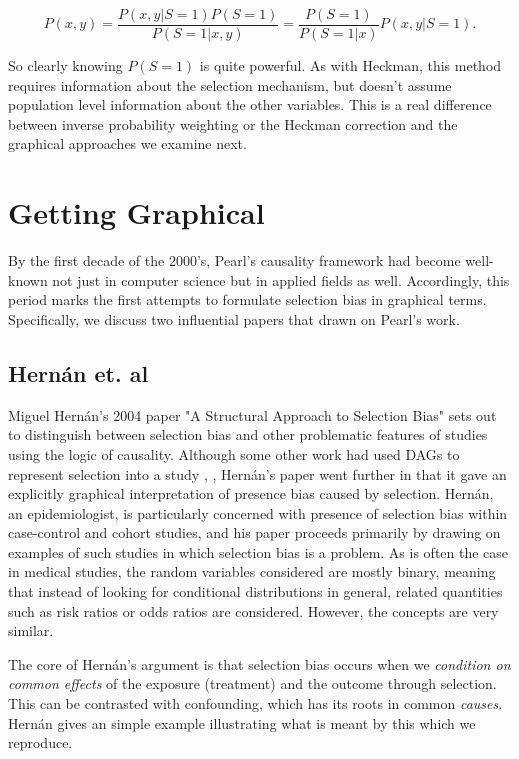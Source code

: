 \documentclass[12pt,twoside]{reedthesis}
\theoremstyle{definition}
\begin{document}
$$P(x,y) = \frac{P(x,y | S = 1) P(S = 1)}{P(S = 1 | x,y)} = \frac{P(S = 1)}{P(S = 1 | x )}P(x,y | S = 1).$$

So clearly knowing $P(S = 1)$ is quite powerful. As with Heckman, this method requires information about the selection mechanism, but doesn't assume population level information about the other variables. This is a real difference between inverse probability weighting or the Heckman correction and the graphical approaches we examine next.

\section{Getting Graphical}


By the first decade of the 2000's, Pearl's causality framework had become well-known not just in computer science but in applied fields as well. Accordingly, this period marks the first attempts to formulate selection bias in graphical terms. Specifically, we discuss two influential papers that drawn on Pearl's work.

\subsection{Hern\'an et. al}

Miguel Hern\'an's 2004 paper "A Structural Approach to Selection Bias" sets out to distinguish between selection bias and other problematic features of studies using the logic of causality. Although some other work had used DAGs to represent selection into a study \citep{Robbins_2001}, \citep{Pearl_1995}, Hern\'an's paper went further in that it gave an explicitly graphical interpretation of presence bias caused by selection. Hern\'an, an epidemiologist, is particularly concerned with presence of selection bias within case-control and cohort studies, and his paper proceeds primarily by drawing on examples of such studies in which selection bias is a problem. As is often the case in medical studies, the random variables considered are mostly binary, meaning that instead of looking for conditional distributions in general, related quantities such as risk ratios or odds ratios are considered. However, the concepts are very similar.

The core of Hern\'an's argument is that selection bias occurs when we \emph{condition on common effects} of the exposure (treatment) and the outcome through selection. This can be contrasted with confounding, which has its roots in common \emph{causes}. Hern\'an gives an simple example illustrating what is meant by this which we reproduce.
\end{document}
